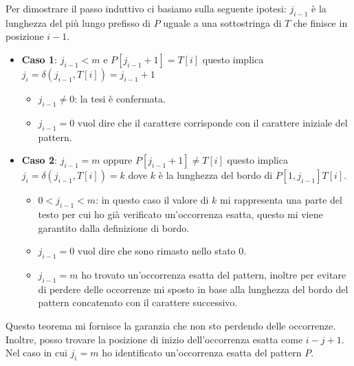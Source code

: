\begin{dimostrazione}
\begin{enumerate}
              Per dimostrare il passo induttivo ci basiamo sulla seguente ipotesi:
              $j_{i - 1}$ è la lunghezza del più lungo prefisso di $P$ uguale a
              una sottostringa di $T$ che finisce in posizione $i - 1$.
              \begin{itemize}
                  \item \textbf{Caso 1}: $j_{i - 1} < m$ e $P[j_{i - 1} + 1] =
                            T[i]$ questo implica $j_i = \delta(j_{i - 1}, T[i])
                            = j_{i - 1} + 1$
                        \begin{itemize}
                            \item $j_{i - 1} \neq 0$: la tesi è confermata.
                            \item $j_{i - 1} = 0$ vuol dire che il carattere
                                  corrisponde con il carattere iniziale del pattern.
                        \end{itemize}
                  \item \textbf{Caso 2}: $j_{i - 1} = m$ oppure $P[j_{i - 1} + 1]
                            \neq T[i]$ questo implica $j_i = \delta(j_{i - 1},
                            T[i]) = k$ dove $k$ è la lunghezza del bordo di
                        $P[1, j_{i - 1}]T[i]$.
                        \begin{itemize}
                            \item $0 < j_{i - 1} < m$: in questo caso il valore
                                  di $k$ mi rappresenta una parte del testo per
                                  cui ho già verificato un'occorrenza esatta,
                                  questo mi viene garantito dalla definizione di
                                  bordo.
                            \item $j_{i - 1} = 0$ vuol dire che sono rimasto
                                  nello stato 0.
                            \item $j_{i - 1} = m$ ho trovato un'occorrenza esatta
                                  del pattern, inoltre per evitare di perdere delle
                                  occorrenze mi sposto in base alla lunghezza del
                                  bordo del pattern concatenato con il carattere
                                  successivo.
                        \end{itemize}
              \end{itemize}
    \end{enumerate}
\end{dimostrazione}
Questo teorema mi fornisce la garanzia che non sto perdendo delle occorrenze.
Inoltre, posso trovare la posizione di inizio dell'occorrenza esatta come $i - j
    + 1$. Nel caso in cui $j_i = m$ ho identificato un'occorrenza esatta del
pattern $P$.


